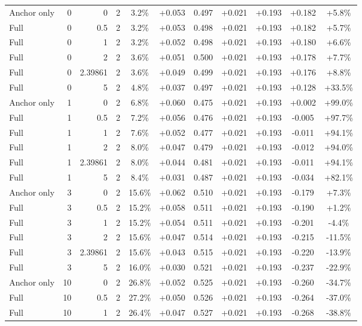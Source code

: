 \begin{table}[htbp]
\begin{tabular}{lrrrccccccc}
Anchor only & 0 & 0 & 2 & 3.2\% & +0.053 & 0.497 & +0.021 & +0.193 & +0.182 & +5.8\% \\
Full & 0 & 0.5 & 2 & 3.2\% & +0.053 & 0.498 & +0.021 & +0.193 & +0.182 & +5.7\% \\
Full & 0 & 1 & 2 & 3.2\% & +0.052 & 0.498 & +0.021 & +0.193 & +0.180 & +6.6\% \\
Full & 0 & 2 & 2 & 3.6\% & +0.051 & 0.500 & +0.021 & +0.193 & +0.178 & +7.7\% \\
Full & 0 & 2.39861 & 2 & 3.6\% & +0.049 & 0.499 & +0.021 & +0.193 & +0.176 & +8.8\% \\
Full & 0 & 5 & 2 & 4.8\% & +0.037 & 0.497 & +0.021 & +0.193 & +0.128 & +33.5\% \\
Anchor only & 1 & 0 & 2 & 6.8\% & +0.060 & 0.475 & +0.021 & +0.193 & +0.002 & +99.0\% \\
Full & 1 & 0.5 & 2 & 7.2\% & +0.056 & 0.476 & +0.021 & +0.193 & -0.005 & +97.7\% \\
Full & 1 & 1 & 2 & 7.6\% & +0.052 & 0.477 & +0.021 & +0.193 & -0.011 & +94.1\% \\
Full & 1 & 2 & 2 & 8.0\% & +0.047 & 0.479 & +0.021 & +0.193 & -0.012 & +94.0\% \\
Full & 1 & 2.39861 & 2 & 8.0\% & +0.044 & 0.481 & +0.021 & +0.193 & -0.011 & +94.1\% \\
Full & 1 & 5 & 2 & 8.4\% & +0.031 & 0.487 & +0.021 & +0.193 & -0.034 & +82.1\% \\
Anchor only & 3 & 0 & 2 & 15.6\% & +0.062 & 0.510 & +0.021 & +0.193 & -0.179 & +7.3\% \\
Full & 3 & 0.5 & 2 & 15.2\% & +0.058 & 0.511 & +0.021 & +0.193 & -0.190 & +1.2\% \\
Full & 3 & 1 & 2 & 15.2\% & +0.054 & 0.511 & +0.021 & +0.193 & -0.201 & -4.4\% \\
Full & 3 & 2 & 2 & 15.6\% & +0.047 & 0.514 & +0.021 & +0.193 & -0.215 & -11.5\% \\
Full & 3 & 2.39861 & 2 & 15.6\% & +0.043 & 0.515 & +0.021 & +0.193 & -0.220 & -13.9\% \\
Full & 3 & 5 & 2 & 16.0\% & +0.030 & 0.521 & +0.021 & +0.193 & -0.237 & -22.9\% \\
Anchor only & 10 & 0 & 2 & 26.8\% & +0.052 & 0.525 & +0.021 & +0.193 & -0.260 & -34.7\% \\
Full & 10 & 0.5 & 2 & 27.2\% & +0.050 & 0.526 & +0.021 & +0.193 & -0.264 & -37.0\% \\
Full & 10 & 1 & 2 & 26.4\% & +0.047 & 0.527 & +0.021 & +0.193 & -0.268 & -38.8\% \\

\end{tabular}
\end{table}
